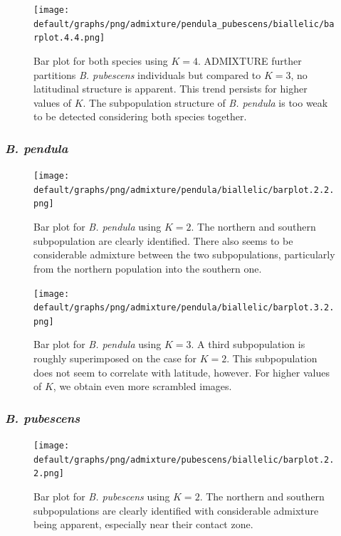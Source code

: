 \documentclass[hidelinks,11pt]{article}
\newcommand{\pendula}{\textit{B. pendula}}
\newcommand{\pubescens}{\textit{B. pubescens}}
\begin{document}
    \begin{figure}[H]
        \centering
        \texttt{[image: default/graphs/png/admixture/pendula\_pubescens/biallelic/barplot.4.4.png]}
        \caption{Bar plot for both species using $K=4$. \mbox{ADMIXTURE} further partitions \pubescens{} individuals but compared to $K=3$, no latitudinal structure is apparent. This trend persists for higher values of $K$. The subpopulation structure of \pendula{} is too weak to be detected considering both species together.}
        \label{fig:admixture_barplot_pendula_pubescens_4}
    \end{figure}

    \subsubsection{\pendula{}}

    \begin{figure}[H]
        \centering
        \texttt{[image: default/graphs/png/admixture/pendula/biallelic/barplot.2.2.png]}
        \caption{Bar plot for \pendula{} using $K=2$. The northern and southern subpopulation are clearly identified. There also seems to be considerable admixture between the two subpopulations, particularly from the northern population into the southern one.}
        \label{fig:admixture_barplot_pendula_2}
    \end{figure}

    \begin{figure}[H]
        \centering
        \texttt{[image: default/graphs/png/admixture/pendula/biallelic/barplot.3.2.png]}
        \caption{Bar plot for \pendula{} using $K=3$. A third subpopulation is roughly superimposed on the case for $K=2$. This subpopulation does not seem to correlate with latitude, however. For higher values of $K$, we obtain even more scrambled images.}
        \label{fig:admixture_barplot_pendula_3}
    \end{figure}

    \subsubsection{\pubescens{}}

    \begin{figure}[H]
        \centering
        \texttt{[image: default/graphs/png/admixture/pubescens/biallelic/barplot.2.2.png]}
        \caption{Bar plot for \pubescens{} using $K=2$. The northern and southern subpopulations are clearly identified with considerable admixture being apparent, especially near their contact zone.}
        \label{fig:admixture_barplot_pubescens_2}
    \end{figure}
\end{document}

